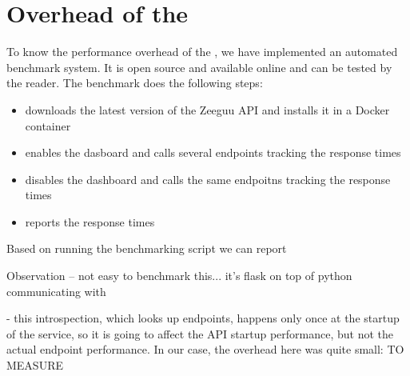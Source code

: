   

\section{Overhead of the \tool}
\label{sec:overhead}


To know the performance overhead of the \tool, we have implemented an automated benchmark system. It is open source and available online and can be tested by the reader. The benchmark does the following steps: 

\begin{itemize}
	\item downloads the latest version of the Zeeguu API and installs it in a Docker container
	\item enables the dasboard and calls several endpoints tracking the response times
	\item disables the dashboard and calls the same endpoitns tracking the response times
	\item reports the response times
\end{itemize}

Based on running the benchmarking script we can report 

Observation -- not easy to benchmark this... it's flask on top of python communicating with 

- this introspection, which looks up endpoints, happens only once at the startup of the service, so it is going to affect the API startup performance, but not the actual endpoint performance. In our case, the overhead here was quite small: TO MEASURE


  
